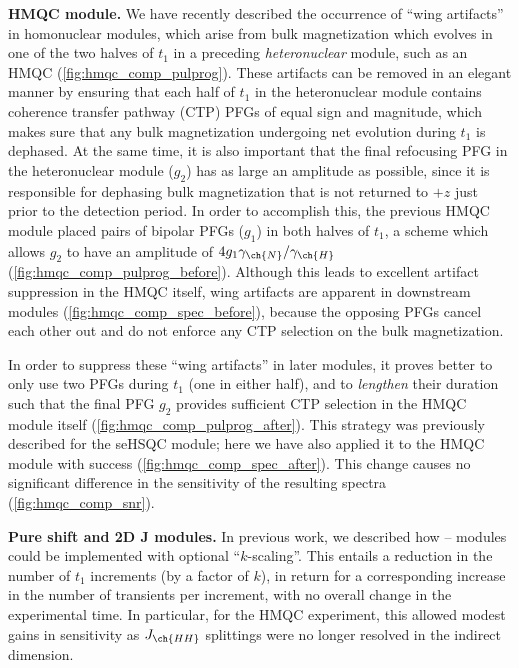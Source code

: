\documentclass[a4paper,11pt]{article}
\newcommand{\proton}{\ch{^{1}H}}
\newcommand{\nitrogen}{\ch{^{15}N}}
\newcommand{\HN}{\proton{}--\nitrogen{}}
\begin{document}
\begin{refsection}
\textbf{\nitrogen{} HMQC module.} We have recently described the occurrence of ``wing artifacts'' in homonuclear modules, which arise from bulk magnetization which evolves in one of the two halves of \(t_1\) in a preceding \textit{heteronuclear} module, such as an HMQC (\cref{fig:hmqc_comp_pulprog}).\autocite{Yong2021JMR}
These artifacts can be removed in an elegant manner by ensuring that each half of \(t_1\) in the heteronuclear module contains coherence transfer pathway (CTP) PFGs of equal sign and magnitude, which makes sure that any bulk magnetization undergoing net evolution during \(t_1\) is dephased.
At the same time, it is also important that the final refocusing PFG in the heteronuclear module (\(g_2\)) has as large an amplitude as possible, since it is responsible for dephasing bulk magnetization that is not returned to \(+z\) just prior to the detection period.
In order to accomplish this, the previous \nitrogen{} HMQC module placed pairs of bipolar PFGs (\(g_1\)) in both halves of \(t_1\), a scheme which allows \(g_2\) to have an amplitude of \(4g_1\gamma_{\ch{N}}/\gamma_{\ch{H}}\) (\cref{fig:hmqc_comp_pulprog_before}).
Although this leads to excellent artifact suppression in the \nitrogen{} HMQC itself, wing artifacts are apparent in downstream modules (\cref{fig:hmqc_comp_spec_before}), because the opposing PFGs cancel each other out and do not enforce any CTP selection on the bulk magnetization.

In order to suppress these ``wing artifacts'' in later modules, it proves better to only use two PFGs during \(t_1\) (one in either half), and to \textit{lengthen} their duration such that the final PFG \(g_2\) provides sufficient CTP selection in the HMQC module itself (\cref{fig:hmqc_comp_pulprog_after}).
This strategy was previously described for the \nitrogen{} seHSQC module;\autocite{Yong2021JMR} here we have also applied it to the HMQC module with success (\cref{fig:hmqc_comp_spec_after}).
This change causes no significant difference in the sensitivity of the resulting spectra (\cref{fig:hmqc_comp_snr}).

\textbf{Pure shift and 2D J modules.} In previous work,\autocite{Yong2021JMR} we described how \HN{} modules could be implemented with optional ``\(k\)-scaling''.\autocite{PerezTrujillo2007MRC}
This entails a reduction in the number of \(t_1\) increments (by a factor of \(k\)), in return for a corresponding increase in the number of transients per increment, with no overall change in the experimental time.
In particular, for the HMQC experiment, this allowed modest gains in sensitivity as \(J_{\ch{HH}}\) splittings were no longer resolved in the indirect dimension.


\end{refsection}
\end{document}
